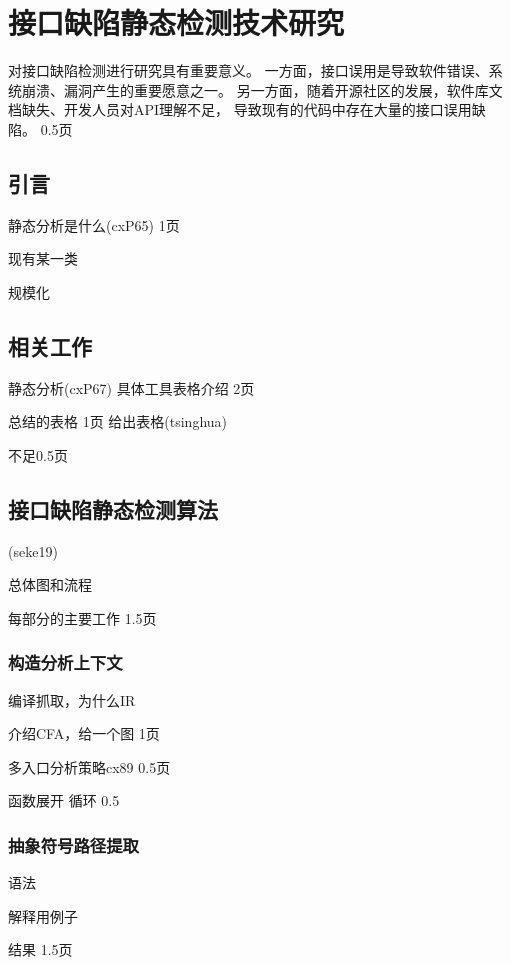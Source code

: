 \chapter{接口缺陷静态检测技术研究}
\label{cha:imchecker}
对接口缺陷检测进行研究具有重要意义。
一方面，接口误用是导致软件错误、系统崩溃、漏洞产生的重要愿意之一。
另一方面，随着开源社区的发展，软件库文档缺失、开发人员对API理解不足，
导致现有的代码中存在大量的接口误用缺陷。
0.5页

\section{引言}
静态分析是什么(cxP65)
1页

现有某一类

规模化

\section{相关工作}

静态分析(cxP67)
具体工具表格介绍
2页

总结的表格
1页
给出表格(tsinghua)

不足0.5页


\section{接口缺陷静态检测算法}
(seke19)

总体图和流程

每部分的主要工作
1.5页

\subsection{构造分析上下文}
编译抓取，为什么IR

介绍CFA，给一个图
1页

多入口分析策略cx89
0.5页

函数展开
循环
0.5

\subsection{抽象符号路径提取}
语法

解释用例子

结果
1.5页
